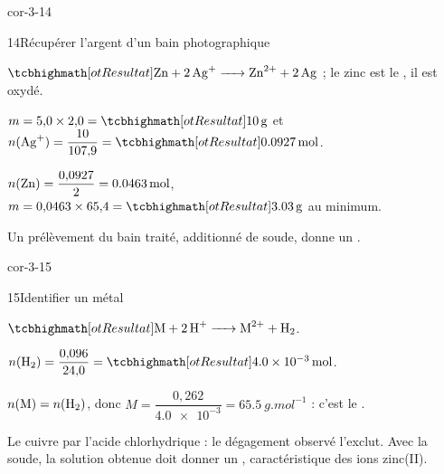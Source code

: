 \begin{blocLivre}{cor-3-14}
\begin{corrige}{14}{Récupérer l'argent d'un bain photographique}
\begin{questions}
\item $\res{\ce{Zn + 2Ag+ -> Zn^{2+} + 2Ag}}$ ; le zinc est le , il est oxydé.
\item $m=5{,}0\times2{,}0=\res{\qty{10}{g}}$ et $n(\ce{Ag+})=\dfrac{10}{107{,}9}=\res{\qty{0,0927}{mol}}$.
\item $n(\ce{Zn})=\dfrac{0{,}0927}{2}=\qty{0,0463}{mol}$, $m=0{,}0463\times65{,}4=\res{\qty{3,03}{g}}$ au minimum.
\item Un prélèvement du bain traité, additionné de soude, donne un .
\end{questions}
\end{corrige}
\end{blocLivre}
\begin{blocLivre}{cor-3-15}
\begin{corrige}{15}{Identifier un métal}
\begin{questions}
\item $\res{\ce{M + 2H+ -> M^{2+} + H2}}$.
\item $n(\ce{H2})=\dfrac{0{,}096}{24{,}0}=\res{\qty{4,0e-3}{mol}}$.
\item $n(\mathrm{M})=n(\ce{H2})$, donc $M=\dfrac{0{,}262}{\num{4.0e-3}}=\qty{65,5}{g.mol^{-1}}$ : c'est le .
\item Le cuivre  par l'acide chlorhydrique : le dégagement observé l'exclut. Avec la soude, la
solution obtenue doit donner un , caractéristique des ions zinc(II).
\end{questions}
\end{corrige}
\end{blocLivre}
